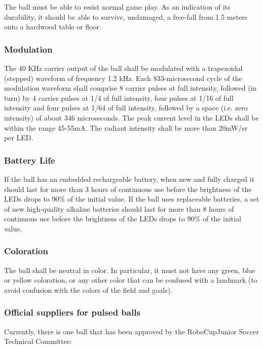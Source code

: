 \documentclass{article}
\begin{document}
The ball must be able to resist normal game play. As an indication of its
durability, it should be able to survive, undamaged, a free-fall from 1.5
meters onto a hardwood table or floor.

\subsubsection{Modulation}

The 40 KHz carrier output of the ball shall be modulated with a trapezoidal
(stepped) waveform of frequency 1.2 kHz. Each 833-microsecond cycle of the
modulation waveform shall comprise 8 carrier pulses at full intensity, followed
(in turn) by 4 carrier pulses at 1/4 of full intensity, four pulses at 1/16 of
full intensity and four pulses at 1/64 of full intensity, followed by a space
(i.e. zero intensity) of about 346 microseconds. The peak current level in the
LEDs shall be within the range 45-55mA. The radiant intensity shall be more
than 20mW/sr per LED.

\subsubsection{Battery Life}

If the ball has an embedded rechargeable battery, when new and fully charged it
should last for more than 3 hours of continuous use before the brightness of
the LEDs drops to 90\% of the initial value. If the ball uses replaceable
batteries, a set of new high-quality alkaline batteries should last for more
than 8 hours of continuous use before the brightness of the LEDs drops to 90\%
of the initial value.

\subsubsection{Coloration}

The ball shall be neutral in color. In particular, it must not have any green,
blue or yellow coloration, or any other color that can be confused with a
landmark (to avoid confusion with the colors of the field and goals).

\subsubsection{Official suppliers for pulsed balls}

Currently, there is one ball that has been approved by the RoboCupJunior Soccer
Technical Committee:
\end{document}
